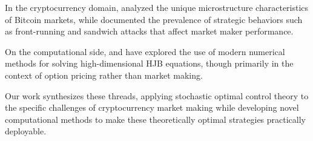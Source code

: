 \documentclass[twocolumn,ieee]{arithmaxresearch}
\begin{document}
In the cryptocurrency domain, \cite{lehalle2019incorporating} analyzed the unique microstructure characteristics of Bitcoin markets, while \cite{daian2020flash} documented the prevalence of strategic behaviors such as front-running and sandwich attacks that affect market maker performance.

On the computational side, \cite{reisinger2018numerical} and \cite{sirignano2019deep} have explored the use of modern numerical methods for solving high-dimensional HJB equations, though primarily in the context of option pricing rather than market making.

Our work synthesizes these threads, applying stochastic optimal control theory to the specific challenges of cryptocurrency market making while developing novel computational methods to make these theoretically optimal strategies practically deployable.
\end{document}
